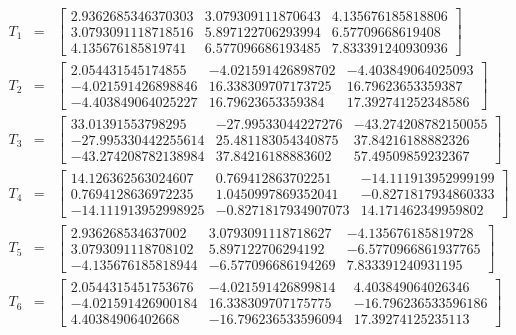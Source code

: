 \begin{eqnarray*}
T_1&=&
\begin{bmatrix}
2.9362685346370303 & 3.079309111870643 & 4.135676185818806\\
3.0793091118718516 & 5.897122706293994 & 6.57709668619408\\
4.135676185819741 & 6.577096686193485 & 7.833391240930936
\end{bmatrix}\\
T_2&=&
\begin{bmatrix}
2.054431545174855 & -4.021591426898702 & -4.403849064025093\\
-4.021591426898846 & 16.338309707173725 & 16.79623653359387\\
-4.403849064025227 & 16.79623653359384 & 17.392741252348586
\end{bmatrix}\\
T_3&=&
\begin{bmatrix}
33.01391553798295 & -27.99533044227276 & -43.274208782150055\\
-27.995330442255614 & 25.481183054340875 & 37.84216188882326\\
-43.274208782138984 & 37.84216188883602 & 57.49509859232367
\end{bmatrix}\\
T_4&=&
\begin{bmatrix}
14.126362563024607 & 0.769412863702251 & -14.111913952999199\\
0.7694128636972235 & 1.0450997869352041 & -0.8271817934860333\\
-14.111913952998925 & -0.8271817934907073 & 14.171462349959802
\end{bmatrix}\\
T_5&=&
\begin{bmatrix}
2.936268534637002 & 3.0793091118718627 & -4.135676185819728\\
3.0793091118708102 & 5.897122706294192 & -6.5770966861937765\\
-4.135676185818944 & -6.577096686194269 & 7.833391240931195
\end{bmatrix}\\
T_6&=&
\begin{bmatrix}
2.0544315451753676 & -4.021591426899814 & 4.403849064026346\\
-4.021591426900184 & 16.338309707175775 & -16.796236533596186\\
4.40384906402668 & -16.796236533596094 & 17.39274125235113
\end{bmatrix}
\end{eqnarray*}
